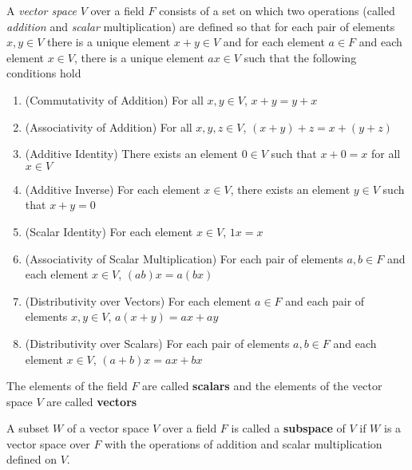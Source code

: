 \begin{definition}
    A \textit{vector space} $V$ over a field $F$ consists of a set on which two operations (called \textit{addition} and \textit{scalar} multiplication) are defined so that for each pair of elements $x, y\in V$ there is a unique element $x + y\in V$ and for each element $a\in F$ and each element $x\in V$, there is a unique element $ax\in V$ such that the following conditions hold 
    \begin{enumerate}
        \item (Commutativity of Addition) For all $x,y\in V$, $x + y = y + x$
        \item (Associativity of Addition) For all $x,y,z\in V$, $(x + y) + z = x + (y + z)$
        \item (Additive Identity) There exists an element $0\in V$ such that $x + 0 = x$ for all $x\in V$ 
        \item (Additive Inverse) For each element $x\in V$, there exists an element $y\in V$ such that $x + y = 0$
        \item (Scalar Identity) For each element $x\in V$, $1x = x$ 
        \item (Associativity of Scalar Multiplication) For each pair of elements $a,b\in F$ and each element $x\in V$, $(ab)x = a(bx)$ 
        \item (Distributivity over Vectors) For each element $a\in F$ and each pair of elements $x,y\in V$, $a(x + y) = ax + ay$
        \item (Distributivity over Scalars) For each pair of elements $a,b\in F$ and each element $x\in V$, $(a + b)x = ax + bx$
    \end{enumerate}
\end{definition}

The elements of the field $F$ are called \textbf{scalars} and the elements of the vector space $V$ are called \textbf{vectors}

\begin{definition}[Subspace]
    A subset $W$ of a vector space $V$ over a field $F$ is called a \textbf{subspace} of $V$ if $W$ is a vector space over $F$ with the operations of addition and scalar multiplication defined on $V$.
\end{definition}

